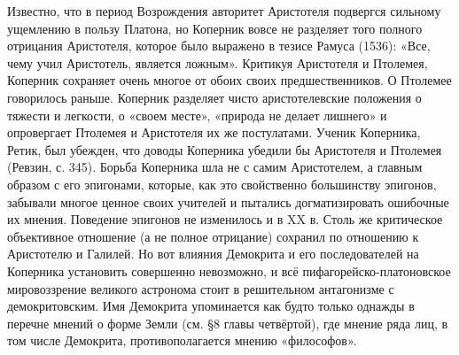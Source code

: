 Известно,  что в  период  Возрождения  авторитет Аристотеля  подвергся
сильному ущемлению  в пользу Платона,  но Коперник вовсе  не разделяет
того  полного отрицания  Аристотеля,  которое было  выражено в  тезисе
Рамуса (1536): «Все, чему  учил Аристотель, является ложным». Критикуя
Аристотеля и Птолемея, Коперник сохраняет  очень многое от обоих своих
предшественников.  О Птолемее  говорилось  раньше. Коперник  разделяет
чисто аристотелевские положения о тяжести и легкости, о «своем месте»,
«природа не  делает лишнего»  и опровергает  Птолемея и  Аристотеля их
же  постулатами.  Ученик Коперника,  Ретик,  был  убежден, что  доводы
Коперника убедили  бы Аристотеля и  Птолемея (Ревзин, с.  345). Борьба
Коперника  шла  не  с  самим  Аристотелем, а  главным  образом  с  его
эпигонами, которые, как это свойственно большинству эпигонов, забывали
многое  ценное своих  учителей  и  пытались догматизировать  ошибочные
их  мнения. Поведение  эпигонов  не  изменилось и  в  XX  в. Столь  же
критическое объективное отношение (а  не полное отрицание) сохранил по
отношению  к Аристотелю  и Галилей.  Но  вот влияния  Демокрита и  его
последователей на  Коперника установить  совершенно невозможно,  и всё
пифагорейско-платоновское  мировоззрение  великого астронома  стоит  в
решительном  антагонизме с  демокритовским. Имя  Демокрита упоминается
как  будто только  однажды  в перечне  мнений о  форме  Земли (см.  §8
главы  четвёртой),  где  мнение  ряда  лиц,  в  том  числе  Демокрита,
противополагается мнению «философов».


